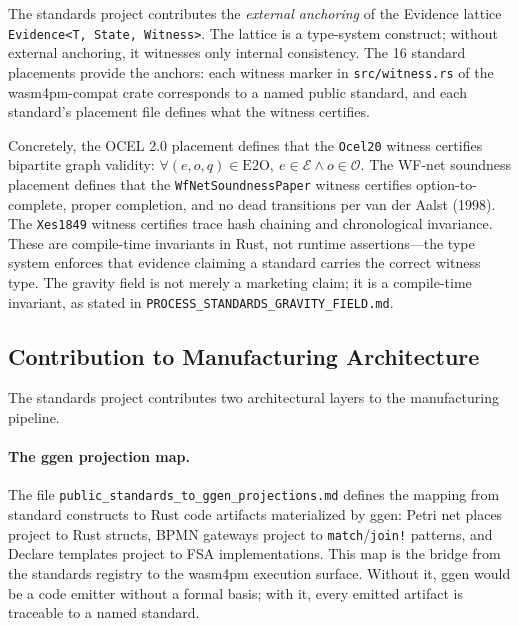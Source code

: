 The standards project contributes the \emph{external anchoring} of the Evidence lattice
\texttt{Evidence<T, State, Witness>}. The lattice is a type-system construct; without
external anchoring, it witnesses only internal consistency. The 16 standard placements
provide the anchors: each witness marker in \texttt{src/witness.rs} of the wasm4pm-compat
crate corresponds to a named public standard, and each standard's placement file defines
what the witness certifies.

Concretely, the OCEL 2.0 placement defines that the \texttt{Ocel20} witness certifies
bipartite graph validity: $\forall (e, o, q) \in \text{E2O},\ e \in \mathcal{E} \land
o \in \mathcal{O}$. The WF-net soundness placement defines that the
\texttt{WfNetSoundnessPaper} witness certifies option-to-complete, proper completion, and
no dead transitions per van der Aalst (1998). The \texttt{Xes1849} witness certifies
trace hash chaining and chronological invariance. These are compile-time invariants in
Rust, not runtime assertions---the type system enforces that evidence claiming a standard
carries the correct witness type. The gravity field is not merely a marketing claim; it
is a compile-time invariant, as stated in \texttt{PROCESS\_STANDARDS\_GRAVITY\_FIELD.md}.

\subsection{Contribution to Manufacturing Architecture}
\label{sec:standards-contribution-manufacturing}

The standards project contributes two architectural layers to the manufacturing pipeline.

\paragraph{The ggen projection map.}
The file \texttt{public\_standards\_to\_ggen\_projections.md} defines the mapping from
standard constructs to Rust code artifacts materialized by ggen: Petri net places project
to Rust structs, BPMN gateways project to \texttt{match}/\texttt{join!} patterns, and
Declare templates project to FSA implementations. This map is the bridge from the
standards registry to the wasm4pm execution surface. Without it, ggen would be a code
emitter without a formal basis; with it, every emitted artifact is traceable to a named
standard.

